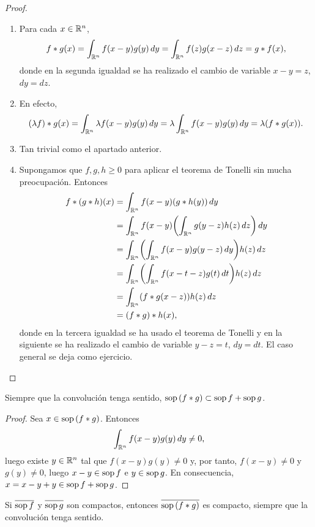 \documentclass[a4paper, 11pt, oneside]{report}
\begin{document}
\begin{proof}
  \hfill
  \begin{enumerate}
    \item Para cada $x \in \mathbb R^n$,
    \[f \ast g(x) = \int_{\mathbb R^n} f(x-y) g(y) \, dy = \int_{\mathbb R^n} f(z)g(x-z) \, dz = g \ast f(x),\]
    donde en la segunda igualdad se ha realizado el cambio de variable $x - y = z$, $dy = dz$.
    \item En efecto,
    \[(\lambda f) \ast g(x) = \int_{\mathbb R^n} \lambda f(x-y)g(y) \, dy = \lambda \int_{\mathbb R^n}f(x-y)g(y) \, dy = \lambda (f \ast g(x)).\]
    \item Tan trivial como el apartado anterior.
    \item Supongamos que $f,g,h \geq 0$ para aplicar el teorema de Tonelli sin mucha preocupación. Entonces
    \[
    \begin{aligned}[t]
    f \ast (g \ast h)(x) &= \int_{\mathbb R^n} f(x-y)(g \ast h(y)) \, dy \\
    &= \int_{\mathbb R^n} f(x-y)\biggl(\int_{\mathbb R^n} g(y-z)h(z) \, dz\biggr) \, dy \\
    &= \int_{\mathbb R^n}\biggl(\int_{\mathbb R^n} f(x-y) g(y-z) \, dy\biggr) h(z) \, dz \\
    &= \int_{\mathbb R^n}\biggl(\int_{\mathbb R^n} f(x-t-z)g(t) \, dt\biggr) h(z) \, dz \\
    &= \int_{\mathbb R^n} (f \ast g(x-z))h(z) \, dz \\
    &= (f \ast g) \ast h(x),
    \end{aligned}
    \]
    donde en la tercera igualdad se ha usado el teorema de Tonelli y en la siguiente se ha realizado el cambio de variable $y-z = t$, $dy = dt$. El caso general se deja como ejercicio. \qedhere
  \end{enumerate}
\end{proof}

\begin{proposition}\label{pro:2.1.2}
  Siempre que la convolución tenga sentido, $\textup{sop}\,(f \ast g) \subset \textup{sop}\, f + \textup{sop}\, g$.  
\end{proposition}

\begin{proof}
  Sea $x \in \textup{sop}\,(f \ast g)$. Entonces
  \[\int_{\mathbb R^n} f(x-y) g(y) \, dy \neq 0,\]
  luego existe $y \in \mathbb R^n$ tal que $f(x-y)g(y) \neq 0$ y, por tanto, $f(x-y) \neq 0$ y $g(y) \neq 0$, luego $x -y \in \textup{sop}\, f$ e $y \in \textup{sop}\, g$. En consecuencia, $x = x-y+y \in \textup{sop}\, f + \textup{sop}\, g$.
\end{proof}

\begin{corollary}\label{cor:2.1.3}
  Si $\overline{\textup{sop}\, f}$ y $\overline{\vphantom{f}\textup{sop}\, g}$ son compactos, entonces $\overline{\textup{sop}\, (f \ast g)}$ es compacto, siempre que la convolución tenga sentido.
\end{corollary}
\end{document}
